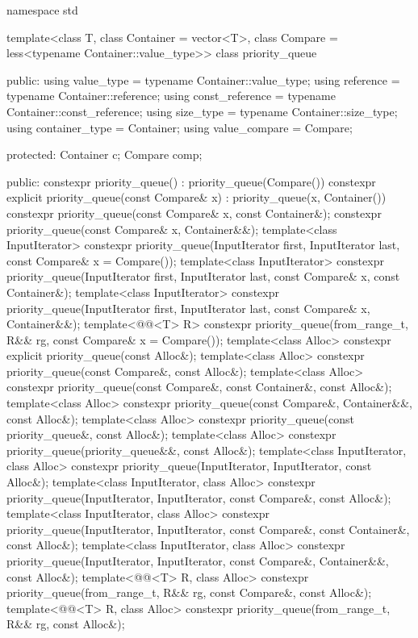 \begin{codeblock}
namespace std {
  template<class T, class Container = vector<T>,
           class Compare = less<typename Container::value_type>>
  class priority_queue {
  public:
    using value_type      = typename Container::value_type;
    using reference       = typename Container::reference;
    using const_reference = typename Container::const_reference;
    using size_type       = typename Container::size_type;
    using container_type  = Container;
    using value_compare   = Compare;

  protected:
    Container c;
    Compare comp;

  public:
    constexpr priority_queue() : priority_queue(Compare()) {}
    constexpr explicit priority_queue(const Compare& x) : priority_queue(x, Container()) {}
    constexpr priority_queue(const Compare& x, const Container&);
    constexpr priority_queue(const Compare& x, Container&&);
    template<class InputIterator>
      constexpr priority_queue(InputIterator first, InputIterator last,
                               const Compare& x = Compare());
    template<class InputIterator>
      constexpr priority_queue(InputIterator first, InputIterator last, const Compare& x,
                               const Container&);
    template<class InputIterator>
      constexpr priority_queue(InputIterator first, InputIterator last, const Compare& x,
                               Container&&);
    template<@@<T> R>
      constexpr priority_queue(from_range_t, R&& rg, const Compare& x = Compare());
    template<class Alloc> constexpr explicit priority_queue(const Alloc&);
    template<class Alloc> constexpr priority_queue(const Compare&, const Alloc&);
    template<class Alloc>
      constexpr priority_queue(const Compare&, const Container&, const Alloc&);
    template<class Alloc> constexpr priority_queue(const Compare&, Container&&, const Alloc&);
    template<class Alloc> constexpr priority_queue(const priority_queue&, const Alloc&);
    template<class Alloc> constexpr priority_queue(priority_queue&&, const Alloc&);
    template<class InputIterator, class Alloc>
      constexpr priority_queue(InputIterator, InputIterator, const Alloc&);
    template<class InputIterator, class Alloc>
      constexpr priority_queue(InputIterator, InputIterator, const Compare&, const Alloc&);
    template<class InputIterator, class Alloc>
      constexpr priority_queue(InputIterator, InputIterator, const Compare&, const Container&,
                               const Alloc&);
    template<class InputIterator, class Alloc>
      constexpr priority_queue(InputIterator, InputIterator, const Compare&, Container&&,
                               const Alloc&);
    template<@@<T> R, class Alloc>
      constexpr priority_queue(from_range_t, R&& rg, const Compare&, const Alloc&);
    template<@@<T> R, class Alloc>
      constexpr priority_queue(from_range_t, R&& rg, const Alloc&);

}}
\end{codeblock}
